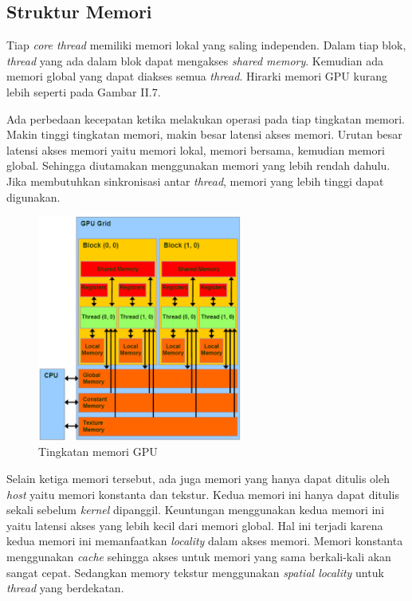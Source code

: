 
  \subsection{Struktur Memori}
    
    Tiap \emph{core thread} memiliki memori lokal yang saling independen. Dalam tiap blok, \emph{thread} yang ada dalam blok dapat mengakses \emph{shared memory}. Kemudian ada memori global yang dapat diakses semua \emph{thread}. Hirarki memori GPU kurang lebih seperti pada Gambar II.7.
    
    Ada perbedaan kecepatan ketika melakukan operasi pada tiap tingkatan memori. Makin tinggi tingkatan memori, makin besar latensi akses memori. Urutan besar latensi akses memori yaitu memori lokal, memori bersama, kemudian memori global. Sehingga diutamakan menggunakan memori yang lebih rendah dahulu. Jika membutuhkan sinkronisasi antar \emph{thread}, memori yang lebih tinggi dapat digunakan. 
    
    \begin{figure}[htb]
      \centering
      \includegraphics[width=0.6\textwidth]{resources/cudamem.png}
      \caption[Tingkatan memori GPU]{Tingkatan memori GPU \citep{cuda}}
    \end{figure}


    Selain ketiga memori tersebut, ada juga memori yang hanya dapat ditulis oleh \emph{host} yaitu memori konstanta dan tekstur. Kedua memori ini hanya dapat ditulis sekali sebelum \emph{kernel} dipanggil. Keuntungan menggunakan kedua memori ini yaitu latensi akses yang lebih kecil dari memori global. Hal ini terjadi karena kedua memori ini memanfaatkan \emph{locality} dalam akses memori. Memori konstanta menggunakan \emph{cache} sehingga akses untuk memori yang sama berkali-kali akan sangat cepat. Sedangkan memory tekstur menggunakan \emph{spatial locality} untuk \emph{thread} yang berdekatan.

